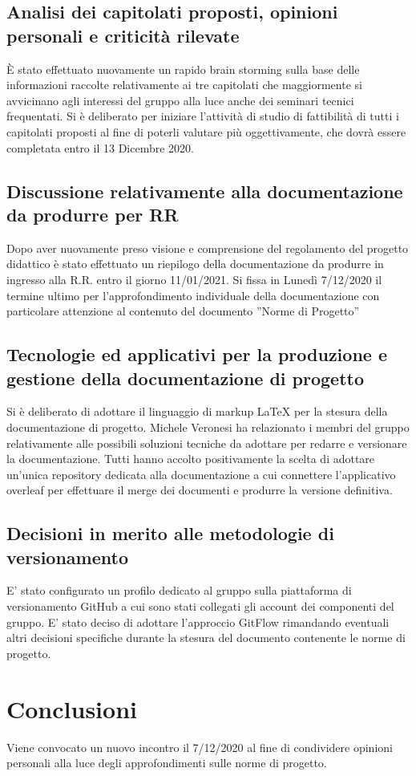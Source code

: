 \subsection{Analisi dei capitolati proposti, opinioni personali e criticità rilevate}
È stato effettuato nuovamente un rapido brain storming sulla base delle informazioni raccolte relativamente ai tre capitolati che maggiormente si avvicinano agli interessi del gruppo alla luce anche dei seminari tecnici frequentati.
Si è deliberato per iniziare l’attività di studio di fattibilità di tutti i capitolati proposti al fine di poterli valutare più oggettivamente, che dovrà essere completata entro il 13 Dicembre 2020.

\subsection{Discussione relativamente alla documentazione da produrre per RR}
Dopo aver nuovamente preso visione e comprensione del regolamento del progetto didattico è stato effettuato un riepilogo della documentazione da produrre in ingresso alla R.R. entro il giorno 11/01/2021. Si fissa in Lunedì 7/12/2020 il termine ultimo per l’approfondimento individuale della documentazione con particolare attenzione al contenuto del documento ”Norme di Progetto”

\subsection{Tecnologie ed applicativi per la produzione e gestione della documentazione di progetto}

Si è deliberato di adottare il linguaggio di markup LaTeX per la stesura della documentazione di progetto. Michele Veronesi ha relazionato i membri del gruppo relativamente alle possibili soluzioni tecniche da adottare per redarre e versionare la documentazione. Tutti hanno accolto positivamente la scelta di adottare un’unica repository dedicata alla documentazione a cui connettere l’applicativo overleaf per effettuare il merge dei documenti e produrre la versione definitiva.

\subsection{Decisioni in merito alle metodologie di versionamento}
E’ stato configurato un profilo dedicato al gruppo sulla piattaforma di versionamento GitHub a cui sono stati collegati gli account dei componenti del gruppo. E’ stato deciso di adottare l’approccio GitFlow rimandando eventuali altri decisioni specifiche durante la stesura del documento contenente le norme di progetto.


\section{Conclusioni}
Viene convocato un nuovo incontro il 7/12/2020 al fine di condividere opinioni personali alla luce degli approfondimenti sulle norme di progetto.